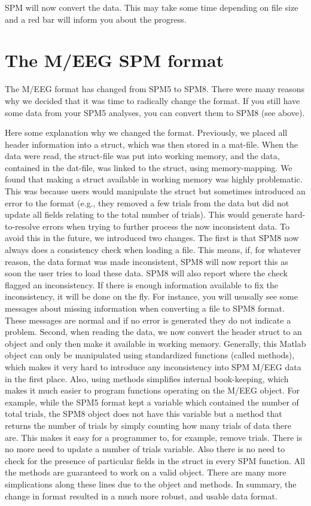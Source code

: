 SPM will now convert the data. This may take some time depending on
file size and a red bar will inform you about the progress.


\section{The M/EEG SPM format}
The M/EEG format has changed from SPM5 to SPM8. There were many
reasons why we decided that it was time to radically change the
format. If you still have some data from your SPM5 analyses, you can
convert them to SPM8 (see above). 

Here some explanation why we changed the format. Previously, we placed
all header information into a struct, which was then stored in a
mat-file. When the data were read, the struct-file was put into
working memory, and the data, contained in the dat-file, was linked to 
the struct, using memory-mapping. We found that making a struct
available in working memory was highly problematic. This was because
users would manipulate the 
struct but sometimes introduced an error to the format (e.g., they
removed a few 
trials from the data but did not update all fields relating to the
total number of trials). This would generate hard-to-resolve errors
when trying to further process the now inconsistent data. To avoid
this in the future, we introduced two changes. The first is that
SPM8 now 
always does a consistency check when loading a file. This means, if,
for whatever reason, the data format was made inconsistent, SPM8 will
now report this as soon the user tries to load these data. SPM8 will
also report where the check flagged an inconsistency. If there is enough
information available to fix the inconsistency, it will be done on the fly.
For instance, you will ususally see some messages about missing information when
converting a file to SPM8 format. These messages are normal and if no 
error is generated they do not indicate a problem. Second,
when reading the data, we now convert the header struct to an object
and only then make it available in working memory. Generally, this
Matlab object can only be manipulated using standardized functions
(called methods), which makes it very hard to introduce any
inconsistency into SPM M/EEG data in the first place. Also, using
methods simplifies internal book-keeping, which makes it much easier
to program functions operating on the M/EEG object. For example, while
the SPM5 format kept a variable which contained the number of total
trials, the SPM8 object does not have this variable but a method that
returns the number of trials by simply counting how many trials of
data there are. This makes it easy for a programmer to, for example,
remove trials. There is no more need to update a number of trials
variable. Also there is no need to check for the presence of particular fields
in the struct in every SPM function. All the methods are guaranteed to work on
a valid object. There are many more simplications along these lines due to
the object and methods. In summary, the change in format resulted in a
much more robust, and usable data format.

